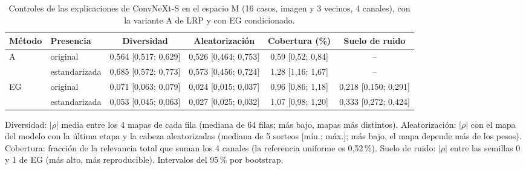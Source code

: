 \begin{table}
\centering
\scriptsize
\setlength{\tabcolsep}{3pt}
\caption{Controles de las explicaciones de ConvNeXt-S en el espacio M (16 casos, imagen y 3 vecinos, 4 canales), con la variante A de LRP y con EG condicionado.}
\label{tab:xai-controles}
\begin{tabular*}{\linewidth}{@{\extracolsep{\fill}}llcccc}
\toprule
Método & Presencia & Diversidad & Aleatorización & Cobertura (\%) & Suelo de ruido \\
\midrule
A & original & 0{,}564 [0{,}517; 0{,}629] & 0{,}526 [0{,}464; 0{,}753] & 0{,}59 [0{,}52; 0{,}84] & -- \\
 & estandarizada & 0{,}685 [0{,}572; 0{,}773] & 0{,}573 [0{,}456; 0{,}724] & 1{,}28 [1{,}16; 1{,}67] & -- \\
\midrule
EG & original & 0{,}071 [0{,}063; 0{,}079] & 0{,}024 [0{,}015; 0{,}037] & 0{,}96 [0{,}86; 1{,}18] & 0{,}218 [0{,}150; 0{,}291] \\
 & estandarizada & 0{,}053 [0{,}045; 0{,}063] & 0{,}027 [0{,}025; 0{,}032] & 1{,}07 [0{,}98; 1{,}20] & 0{,}333 [0{,}272; 0{,}424] \\
\bottomrule
\end{tabular*}

\smallskip
\parbox{\linewidth}{\scriptsize Diversidad: $|\rho|$ media entre los 4 mapas de cada fila (mediana de 64 filas; más bajo, mapas más distintos). Aleatorización: $|\rho|$ con el mapa del modelo con la última etapa y la cabeza aleatorizadas (mediana de 5 sorteos [mín.; máx.]; más bajo, el mapa depende más de los pesos). Cobertura: fracción de la relevancia total que suman los 4 canales (la referencia uniforme es 0,52\,\%). Suelo de ruido: $|\rho|$ entre las semillas 0 y 1 de EG (más alto, más reproducible). Intervalos del 95\,\% por bootstrap.}
\end{table}
